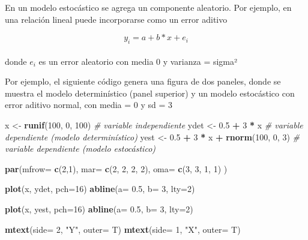 \documentclass[]{book}
\newenvironment{Shaded}{\begin{snugshade}}{\end{snugshade}}
\newcommand{\CommentTok}[1]{\textcolor[rgb]{0.56,0.35,0.01}{\textit{#1}}}
\newcommand{\DataTypeTok}[1]{\textcolor[rgb]{0.13,0.29,0.53}{#1}}
\newcommand{\DecValTok}[1]{\textcolor[rgb]{0.00,0.00,0.81}{#1}}
\newcommand{\FloatTok}[1]{\textcolor[rgb]{0.00,0.00,0.81}{#1}}
\newcommand{\KeywordTok}[1]{\textcolor[rgb]{0.13,0.29,0.53}{\textbf{#1}}}
\newcommand{\NormalTok}[1]{#1}
\newcommand{\OperatorTok}[1]{\textcolor[rgb]{0.81,0.36,0.00}{\textbf{#1}}}
\newcommand{\StringTok}[1]{\textcolor[rgb]{0.31,0.60,0.02}{#1}}
\begin{document}
En un modelo estocástico se agrega un componente aleatorio. Por ejemplo, en una relación lineal puede incorporarse como un error aditivo

\[y_{i} = a + b*x + e_{i}\]\\
donde \(e_{i}\) es un error aleatorio con media 0 y varianza = sigma²

Por ejemplo, el siguiente código genera una figura de dos paneles, donde se muestra el modelo determinístico (panel superior) y un modelo estocástico con error aditivo normal, con media = 0 y sd = 3

\begin{Shaded}
\begin{Highlighting}[]
\NormalTok{  x <-}\StringTok{ }\KeywordTok{runif}\NormalTok{(}\DecValTok{100}\NormalTok{, }\DecValTok{0}\NormalTok{, }\DecValTok{100}\NormalTok{) }\CommentTok{# variable independiente}
\NormalTok{  ydet <-}\StringTok{ }\FloatTok{0.5} \OperatorTok{+}\StringTok{ }\DecValTok{3} \OperatorTok{*}\StringTok{ }\NormalTok{x }\CommentTok{# variable dependiente (modelo determinístico)}
\NormalTok{  yest <-}\StringTok{ }\FloatTok{0.5} \OperatorTok{+}\StringTok{ }\DecValTok{3} \OperatorTok{*}\StringTok{ }\NormalTok{x }\OperatorTok{+}\StringTok{ }\KeywordTok{rnorm}\NormalTok{(}\DecValTok{100}\NormalTok{, }\DecValTok{0}\NormalTok{, }\DecValTok{3}\NormalTok{) }\CommentTok{# variable dependiente (modelo estocástico)}
  
\KeywordTok{par}\NormalTok{(}\DataTypeTok{mfrow=} \KeywordTok{c}\NormalTok{(}\DecValTok{2}\NormalTok{,}\DecValTok{1}\NormalTok{), }\DataTypeTok{mar=} \KeywordTok{c}\NormalTok{(}\DecValTok{2}\NormalTok{, }\DecValTok{2}\NormalTok{, }\DecValTok{2}\NormalTok{, }\DecValTok{2}\NormalTok{), }\DataTypeTok{oma=} \KeywordTok{c}\NormalTok{(}\DecValTok{3}\NormalTok{, }\DecValTok{3}\NormalTok{, }\DecValTok{1}\NormalTok{, }\DecValTok{1}\NormalTok{) ) }
    
    \KeywordTok{plot}\NormalTok{(x, ydet, }\DataTypeTok{pch=}\DecValTok{16}\NormalTok{)}
    \KeywordTok{abline}\NormalTok{(}\DataTypeTok{a=} \FloatTok{0.5}\NormalTok{, }\DataTypeTok{b=} \DecValTok{3}\NormalTok{, }\DataTypeTok{lty=}\DecValTok{2}\NormalTok{)}
    
    \KeywordTok{plot}\NormalTok{(x, yest, }\DataTypeTok{pch=}\DecValTok{16}\NormalTok{)}
    \KeywordTok{abline}\NormalTok{(}\DataTypeTok{a=} \FloatTok{0.5}\NormalTok{, }\DataTypeTok{b=} \DecValTok{3}\NormalTok{, }\DataTypeTok{lty=}\DecValTok{2}\NormalTok{)}
    
    \KeywordTok{mtext}\NormalTok{(}\DataTypeTok{side=} \DecValTok{2}\NormalTok{, }\StringTok{"Y"}\NormalTok{, }\DataTypeTok{outer=}\NormalTok{ T)}
    \KeywordTok{mtext}\NormalTok{(}\DataTypeTok{side=} \DecValTok{1}\NormalTok{, }\StringTok{"X"}\NormalTok{, }\DataTypeTok{outer=}\NormalTok{ T)}
\end{Highlighting}
\end{Shaded}
\end{document}
